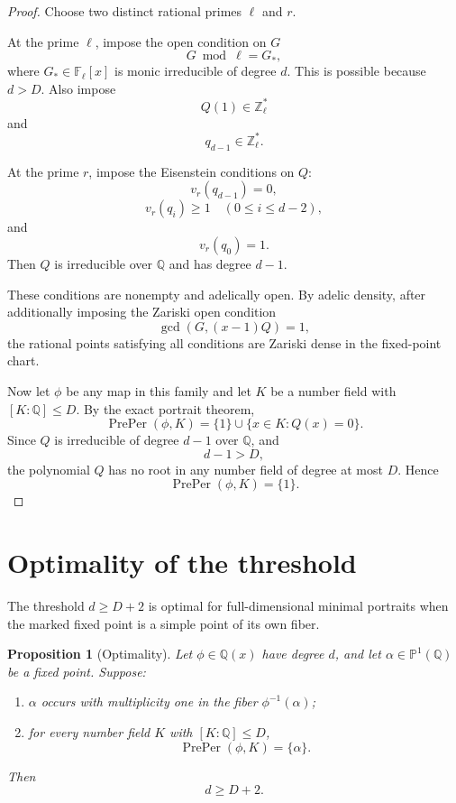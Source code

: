 \documentclass[11pt]{article}
\newtheorem{proposition}[theorem]{Proposition}
\begin{document}
\begin{proof}
Choose two distinct rational primes \(\ell\) and \(r\).

At the prime \(\ell\), impose the open condition on \(G\)
\[
G\bmod \ell=G_\ast,
\]
where \(G_\ast\in\mathbb F_\ell[x]\) is monic irreducible of degree \(d\). This is possible because \(d>D\). Also impose
\[
Q(1)\in\mathbb Z_\ell^\ast
\]
and
\[
q_{d-1}\in\mathbb Z_\ell^\ast.
\]

At the prime \(r\), impose the Eisenstein conditions on \(Q\):
\[
v_r(q_{d-1})=0,
\]
\[
v_r(q_i)\ge1\quad(0\le i\le d-2),
\]
and
\[
v_r(q_0)=1.
\]
Then \(Q\) is irreducible over \(\mathbb Q\) and has degree \(d-1\).

These conditions are nonempty and adelically open. By adelic density, after additionally imposing the Zariski open condition
\[
\gcd(G,(x-1)Q)=1,
\]
the rational points satisfying all conditions are Zariski dense in the fixed-point chart.

Now let \(\phi\) be any map in this family and let \(K\) be a number field with \([K:\mathbb Q]\le D\). By the exact portrait theorem,
\[
\operatorname{PrePer}(\phi,K)=\{1\}\cup\{x\in K:Q(x)=0\}.
\]
Since \(Q\) is irreducible of degree \(d-1\) over \(\mathbb Q\), and
\[
d-1>D,
\]
the polynomial \(Q\) has no root in any number field of degree at most \(D\). Hence
\[
\operatorname{PrePer}(\phi,K)=\{1\}.
\]
\end{proof}

\section{Optimality of the threshold}

The threshold \(d\ge D+2\) is optimal for full-dimensional minimal portraits when the marked fixed point is a simple point of its own fiber.

\begin{proposition}[Optimality]
Let \(\phi\in\mathbb Q(x)\) have degree \(d\), and let \(\alpha\in\mathbb P^1(\mathbb Q)\) be a fixed point. Suppose:
\begin{enumerate}
\item \(\alpha\) occurs with multiplicity one in the fiber \(\phi^{-1}(\alpha)\);
\item for every number field \(K\) with \([K:\mathbb Q]\le D\),
\[
\operatorname{PrePer}(\phi,K)=\{\alpha\}.
\]
\end{enumerate}
Then
\[
d\ge D+2.
\]
\end{proposition}
\end{document}
